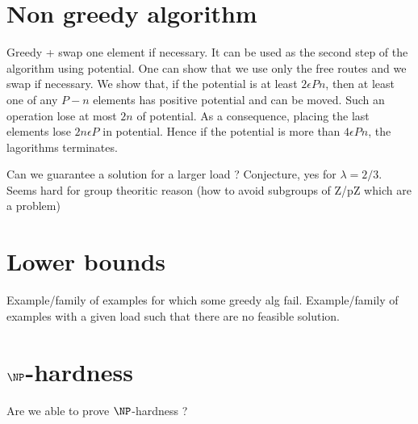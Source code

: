 \documentclass[10pt, conference, letterpaper]{IEEEtran}
\begin{document}
\section{Non greedy algorithm}

Greedy + swap one element if necessary. It can be used as the second step of the algorithm using potential. One can show that we use only the free routes and we swap if necessary. We show that, if the potential is at least $2\epsilon P n$, then at least one of any 
$P-n$ elements has positive potential and can be moved. Such an operation lose at most $2n$ of potential. As a consequence, placing the last elements lose $2n\epsilon P$ in potential. Hence if the potential is more than $4\epsilon P n$, the lagorithms terminates.



Can we guarantee a solution for a larger load ? Conjecture, yes for $\lambda = 2/3$. 
Seems hard for group theoritic reason (how to avoid subgroups of Z/pZ which are a problem)

\section{Lower bounds}

Example/family of examples for which some greedy alg fail.
Example/family of examples with a given load such that there are no feasible solution.

\section{$\NP$-hardness}

Are we able to prove $\NP$-hardness ?

% 
% 
\end{document}
